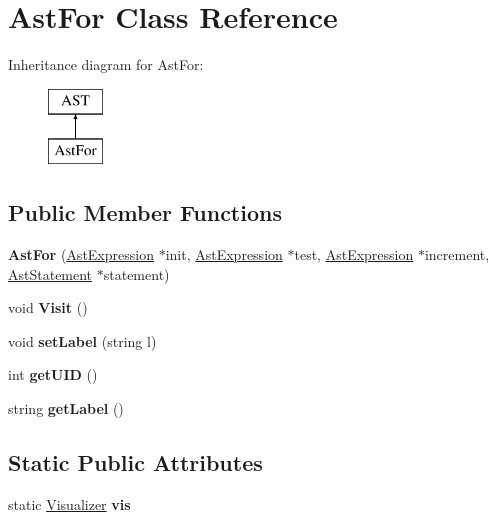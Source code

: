 \hypertarget{classAstFor}{\section{Ast\-For Class Reference}
\label{classAstFor}
}
Inheritance diagram for Ast\-For\-:\begin{figure}[H]
\begin{center}
\leavevmode
\includegraphics[height=2.000000cm]{classAstFor}
\end{center}
\end{figure}
\subsection*{Public Member Functions}
\begin{DoxyCompactItemize}
\item 
\hypertarget{classAstFor_af4b510c833d8cb2b64e5ba1d700b6e1b}{{\bfseries Ast\-For} (\hyperlink{classAstExpression}{Ast\-Expression} $\ast$init, \hyperlink{classAstExpression}{Ast\-Expression} $\ast$test, \hyperlink{classAstExpression}{Ast\-Expression} $\ast$increment, \hyperlink{classAstStatement}{Ast\-Statement} $\ast$statement)}\label{classAstFor_af4b510c833d8cb2b64e5ba1d700b6e1b}

\item 
\hypertarget{classAstFor_aabb94ea30de2b634b35c02ec3688d0ff}{void {\bfseries Visit} ()}\label{classAstFor_aabb94ea30de2b634b35c02ec3688d0ff}

\item 
\hypertarget{classAST_a71d680856e95ff89f55d5311a552eba6}{void {\bfseries set\-Label} (string l)}\label{classAST_a71d680856e95ff89f55d5311a552eba6}

\item 
\hypertarget{classAST_ab7a5b1d9f1c2de0d98deb356f724a42c}{int {\bfseries get\-U\-I\-D} ()}\label{classAST_ab7a5b1d9f1c2de0d98deb356f724a42c}

\item 
\hypertarget{classAST_aee029be902fffc927d16ccb03eb922ad}{string {\bfseries get\-Label} ()}\label{classAST_aee029be902fffc927d16ccb03eb922ad}

\end{DoxyCompactItemize}
\subsection*{Static Public Attributes}
\begin{DoxyCompactItemize}
\item 
\hypertarget{classAST_aca9e6637209b31e03a09c0d42f29bdfa}{static \hyperlink{classVisualizer}{Visualizer} {\bfseries vis}}\label{classAST_aca9e6637209b31e03a09c0d42f29bdfa}

\end{DoxyCompactItemize}
